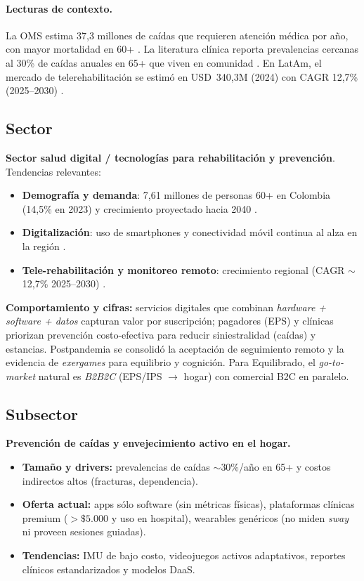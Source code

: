 \paragraph{Lecturas de contexto.}
La OMS estima 37{,}3 millones de caídas que requieren atención médica por año, con mayor mortalidad en 60+ \cite{WHO2021Falls}. La literatura clínica reporta prevalencias cercanas al 30\% de caídas anuales en 65+ que viven en comunidad \cite{Santamaria2014Falls}. En LatAm, el mercado de telerehabilitación se estimó en USD~340{,}3M (2024) con CAGR 12{,}7\% (2025--2030) \cite{GrandViewTelerehab}.

\subsection{Sector}
\textbf{Sector salud digital / tecnologías para rehabilitación y prevención}. Tendencias relevantes:
\begin{itemize}
    \item \textbf{Demografía y demanda}: 7{,}61 millones de personas 60+ en Colombia (14{,}5\% en 2023) y crecimiento proyectado hacia 2040 \cite{MinsaludMayores2024,DANEProyecciones2042}.
    \item \textbf{Digitalización}: uso de smartphones y conectividad móvil continua al alza en la región \cite{GSMA2024MobileLatAm}.
    \item \textbf{Tele-rehabilitación y monitoreo remoto}: crecimiento regional (CAGR $\sim$12{,}7\% 2025--2030) \cite{GrandViewTelerehab}.
\end{itemize}

\noindent
\textbf{Comportamiento y cifras:} servicios digitales que combinan \emph{hardware + software + datos} capturan valor por suscripción; pagadores (EPS) y clínicas priorizan prevención costo-efectiva para reducir siniestralidad (caídas) y estancias. Postpandemia se consolidó la aceptación de seguimiento remoto y la evidencia de \emph{exergames} para equilibrio y cognición. Para Equilibrado, el \emph{go-to-market} natural es \emph{B2B2C} (EPS/IPS $\rightarrow$ hogar) con comercial B2C en paralelo.

\subsection{Subsector}
\textbf{Prevención de caídas y envejecimiento activo en el hogar.} 
\begin{itemize}
    \item \textbf{Tamaño y drivers:} prevalencias de caídas $\sim$30\%/año en 65+ \cite{Santamaria2014Falls} y costos indirectos altos (fracturas, dependencia). 
    \item \textbf{Oferta actual:} apps sólo software (sin métricas físicas), plataformas clínicas premium ($>\$5.000$ y uso en hospital), wearables genéricos (no miden \emph{sway} ni proveen sesiones guiadas). 
    \item \textbf{Tendencias:} IMU de bajo costo, videojuegos activos adaptativos, reportes clínicos estandarizados y modelos DaaS.
\end{itemize}

